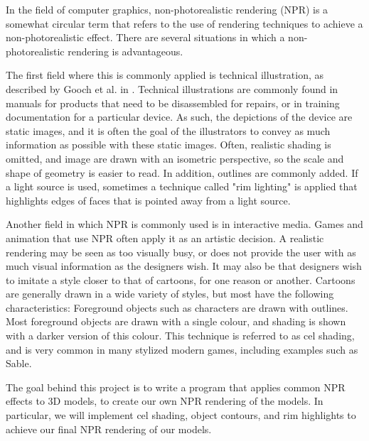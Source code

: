 In the field of computer graphics, non-photorealistic rendering (NPR) is a somewhat circular term that 
refers to the use of rendering techniques to achieve a non-photorealistic effect. There are several 
situations in which a non-photorealistic rendering is advantageous. 

The first field where this is commonly applied is technical illustration, as described by Gooch et al. 
in \cite{gooch98}. Technical illustrations are commonly found
in manuals for products that need to be disassembled for repairs, or in training documentation for a 
particular device. As such, the depictions of the device are static images, and it is often the goal of
the illustrators to convey as much information as possible with these static images. Often, realistic
shading is omitted, and image are drawn with an isometric perspective, so the scale and shape of 
geometry is easier to read. In addition, outlines are commonly added. If a light source is used, 
sometimes a technique called "rim lighting" is applied that highlights edges of faces that is pointed 
away from a light source.

Another field in which NPR is commonly used is in interactive media. Games and animation that use NPR
often apply it as an artistic decision. A realistic rendering may be seen as
too visually busy, or does not provide the user with as much visual information as the designers wish.
It may also be that designers wish to imitate a style closer to that of cartoons, for one reason or 
another. Cartoons are generally drawn in a wide variety of styles, but most have the following 
characteristics: Foreground objects such as characters are drawn with outlines. Most foreground objects
are drawn with a single colour, and shading is shown with a darker version of this colour. This 
technique is referred to as cel shading, and is very common in many stylized modern games, including
examples such as Sable.

The goal behind this project is to write a program that applies common NPR effects to 3D models, to 
create our own NPR rendering of the models. In particular, we will implement cel shading, object 
contours, and rim highlights to achieve our final NPR rendering of our models. 
